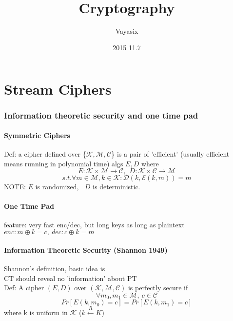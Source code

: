 \documentclass[11pt, oneside]{article}  %
\title{Cryptography}
\author{Vayasix}
\date{2015 11.7}
\begin{document}
\maketitle\newpage

\part{Stream Ciphers}
\section{Information theoretic security and one time pad}
\subsection{Symmetric Ciphers}


Def: a cipher defined over \{${\mathcal{K, M, C}}$\} is a pair of 'efficient'
(usually efficient means running in polynomial time) algs \(\mathit{E, D}\) where
\[
  \mathit{E} : \mathcal{K} \times \mathcal{M} \to \mathcal{C},~ ~   
  \mathit{D} : \mathcal{K} \times \mathcal{C} \to \mathcal{M}
\]
\[
  s.t. \forall m \in \mathcal{M}, k \in \mathcal{K} : \mathcal{D}(k, \mathcal{E}(k, m)) = m
\]
NOTE: $\mathit{E}$ is randomized, $~$ $\mathit{D}$ is deterministic.
\newline

\subsection{One Time Pad}
feature: very fast enc/dec, but long keys as long as plaintext\\
$enc: m \oplus k = c, ~ dec: c \oplus k = m$

\subsection{Information Theoretic Security (Shannon 1949)}
Shannon's definition, basic idea is \\
CT should reveal no 'information' about PT\\
\newline
Def: A cipher $(\mathit{E, D})$ over $(\mathcal{K, M, C})$ is perfectly secure if
\[
  \forall m_0, m_1 \in \mathcal{M},~ c \in \mathcal{C}
\]\[
  Pr[\mathit{E}(k, m_0) = c] = Pr[\mathit{E}(k, m_1) = c] 
\]
where k is uniform in $\mathcal{K}$ ($k \xleftarrow{R} K$)
\end{document}
